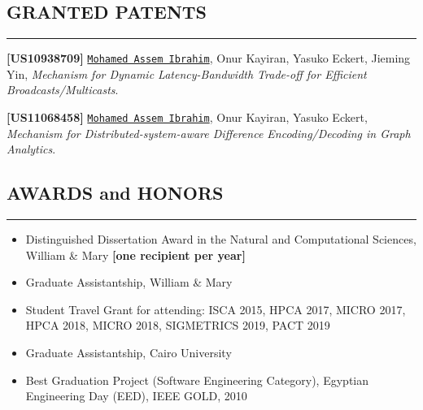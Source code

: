 \documentclass[10pt,a4]{article}
\begin{document}
\subsection*{GRANTED PATENTS}
\hrule
\vspace{0.2cm}

\begin{description}

\item 
{\bf [US10938709]}
{\tt \underline{Mohamed Assem Ibrahim}}, Onur Kayiran, Yasuko Eckert, Jieming Yin,
{\it Mechanism for Dynamic Latency-Bandwidth Trade-off for Efficient Broadcasts/Multicasts}.

{\bf [US11068458]}
{\tt \underline{Mohamed Assem Ibrahim}}, Onur Kayiran, Yasuko Eckert,
{\it Mechanism for Distributed-system-aware Difference Encoding/Decoding in Graph Analytics}.

\end{description}

\subsection*{AWARDS and HONORS}
\hrule
\vspace{0.2cm}
\begin{itemize}
\item Distinguished Dissertation Award in the Natural and Computational Sciences, William \& Mary {\bf [one recipient per year]}
\item Graduate Assistantship, William \& Mary
\item Student Travel Grant for attending: ISCA 2015, HPCA 2017, MICRO 2017, HPCA 2018, MICRO 2018, SIGMETRICS 2019, PACT 2019
\item Graduate Assistantship, Cairo University
\item Best Graduation Project (Software Engineering Category), Egyptian Engineering Day (EED), IEEE GOLD, 2010
\end{itemize}


\end{document}
